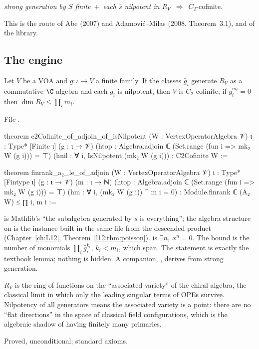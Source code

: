 \begin{center}
\emph{strong generation by $S$ finite}\ +\ \emph{each $\bar s$ nilpotent in $R_V$}\ $\Longrightarrow$\ $C_2$-cofinite.
\end{center}

This is the route of Abe (2007) and Adamovi\'c--Milas (2008, Theorem~3.1), and of the library.

\subsection{The engine}

\begin{theorem}\label{l18:thm:engine}
Let $V$ be a VOA and $g:\iota\to V$ a finite family. If the classes $\bar g_i$ generate $R_V$ as a
commutative $\C$-algebra and each $\bar g_i$ is nilpotent, then $V$ is $C_2$-cofinite; if
$\bar g_i^{m_i}=0$ then $\dim R_V\le\prod_im_i$.
\end{theorem}
\noindent File .
\begin{leancode}
theorem c2Cofinite_of_adjoin_of_isNilpotent (W : VertexOperatorAlgebra 𝒱) {ι : Type*}
    [Finite ι] (g : ι → 𝒱)
    (htop : Algebra.adjoin ℂ (Set.range (fun i => mk₂ W (g i))) = ⊤)
    (hnil : ∀ i, IsNilpotent (mk₂ W (g i))) : C2Cofinite W :=

theorem finrank_a₂_le_of_adjoin (W : VertexOperatorAlgebra 𝒱) {ι : Type*}
    [Fintype ι] (g : ι → 𝒱) (m : ι → ℕ)
    (htop : Algebra.adjoin ℂ (Set.range (fun i => mk₂ W (g i))) = ⊤)
    (hm : ∀ i, (mk₂ W (g i)) ^ m i = 0) :
    Module.finrank ℂ (A₂ W) ≤ ∏ i, m i :=
\end{leancode}
\begin{dictionary}
 is Mathlib's ``the subalgebra generated by $s$ is everything'';
the algebra structure on  is the instance  built in the same file from the
descended product (Chapter~\ref{ch:L12}, Theorem~\ref{l12:thm:poisson}).  is
$\exists n,\ x^n=0$. The bound is the number of monomials $\prod_i\bar g_i^{k_i}$, $k_i<m_i$, which span. The
statement is exactly the textbook lemma; nothing is hidden. A companion,
, derives  from strong generation.
\end{dictionary}
\begin{physics}
$R_V$ is the ring of functions on the ``associated variety'' of the chiral algebra, the classical
limit in which only the leading singular terms of OPEs survive. Nilpotency of all generators means
the associated variety is a point: there are no ``flat directions'' in the space of classical field
configurations, which is the algebraic shadow of having finitely many primaries.
\end{physics}
\begin{status}
Proved, unconditional; standard axioms.
\end{status}

